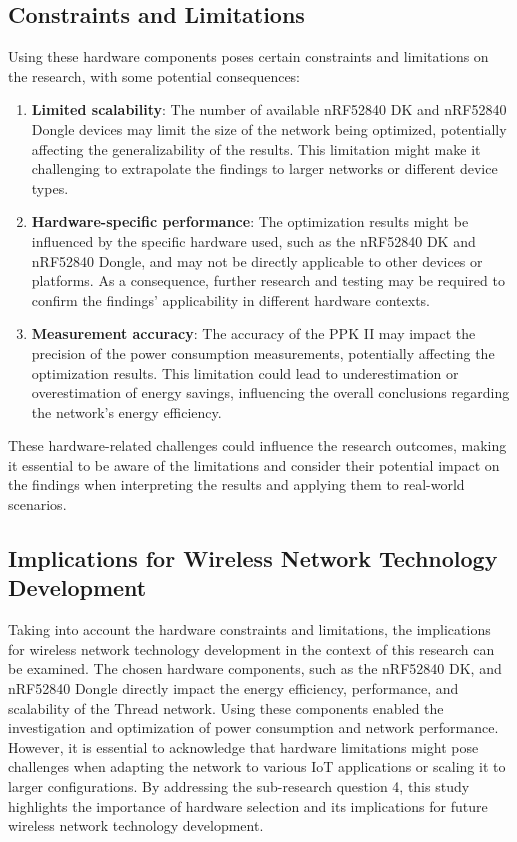 \subsection{Constraints and Limitations}

Using these hardware components poses certain constraints and limitations on the research, with some potential consequences:

\begin{enumerate}
    \item \textbf{Limited scalability}: The number of available \gls{nRF}52840 \gls{DK} and \gls{nRF}52840 Dongle devices may limit the size of the network being optimized, potentially affecting the generalizability of the results. This limitation might make it challenging to extrapolate the findings to larger networks or different device types.
    \item \textbf{Hardware-specific performance}: The optimization results might be influenced by the specific hardware used, such as the \gls{nRF}52840 \gls{DK} and \gls{nRF}52840 Dongle, and may not be directly applicable to other devices or platforms. As a consequence, further research and testing may be required to confirm the findings' applicability in different hardware contexts.
    \item \textbf{Measurement accuracy}: The accuracy of the \gls{PPK} II may impact the precision of the power consumption measurements, potentially affecting the optimization results. This limitation could lead to underestimation or overestimation of energy savings, influencing the overall conclusions regarding the network's energy efficiency.
\end{enumerate}

These hardware-related challenges could influence the research outcomes, making it essential to be aware of the limitations and consider their potential impact on the findings when interpreting the results and applying them to real-world scenarios.

\subsection{Implications for Wireless Network Technology Development}

Taking into account the hardware constraints and limitations, the implications for wireless network technology development in the context of this research can be examined. The chosen hardware components, such as the \gls{nRF}52840 \gls{DK}, and \gls{nRF}52840 Dongle directly impact the energy efficiency, performance, and scalability of the Thread network. Using these components enabled the investigation and optimization of power consumption and network performance. However, it is essential to acknowledge that hardware limitations might pose challenges when adapting the network to various \gls{IoT} applications or scaling it to larger configurations. By addressing the sub-research question 4, this study highlights the importance of hardware selection and its implications for future wireless network technology development.

